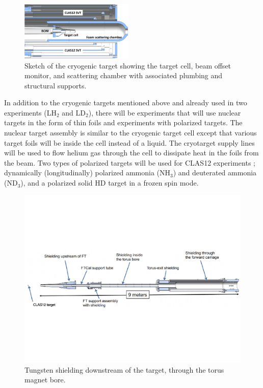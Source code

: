 \begin{figure}[t]
\begin{center}
\includegraphics[width=0.48\textwidth]{target_sch.pdf}
\caption{Sketch of the cryogenic target showing the target cell, beam offset monitor, and scattering chamber
  with associated plumbing and structural supports.}
\label{fig:targsch}
\end{center}
\end{figure}

In addition to the cryogenic targets mentioned above and already used in two experiments (LH$_2$ and LD$_2$),
there will be experiments that will use nuclear targets in the form of thin foils and experiments with polarized
targets. The nuclear target assembly is similar to the cryogenic target cell except that various target foils will be
inside the cell instead of a liquid. The cryotarget supply lines will be used to flow helium gas through the cell to
dissipate heat in the foils from the beam. Two types of polarized targets will be used for CLAS12 experiments
\cite{Keith:2015ete}; dynamically (longitudinally) polarized ammonia (NH$_3$) and deuterated ammonia (ND$_3$),
and a polarized solid HD target in a frozen spin mode. 

\begin{figure}[ht]
\begin{center}
\includegraphics[width=1.0\textwidth]{beamline_hall_shielding.pdf}
\caption{Tungsten shielding downstream of the target, through the torus magnet bore.}
\label{fig:shield}
\end{center}
\end{figure}

